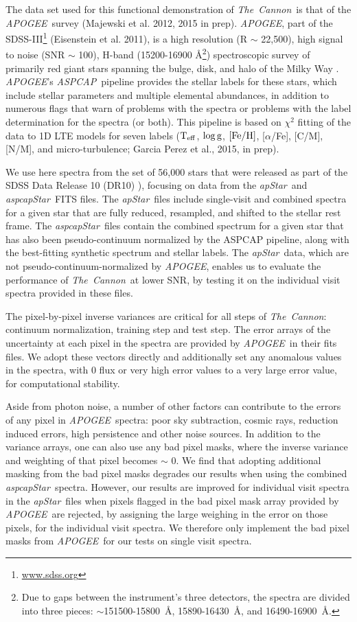 \documentclass[12pt, preprint]{aastex}
\newcommand{\tc}{\textsl{The~Cannon}}
\newcommand{\apogee}{\textsl{APOGEE}}
\newcommand{\aspcap}{\textsl{ASPCAP}}
\newcommand{\aspcapstar}{\textsl{aspcapStar}}
\newcommand{\apstar}{\textsl{apStar}}
\newcommand{\teff}{\mbox{$\rm T_{eff}$}}
\newcommand{\feh}{\mbox{$\rm [Fe/H]$}}
\newcommand{\logg}{\mbox{$\rm \log g$}}
\begin{document}
The data set used for this functional demonstration of \tc\ is that of the \apogee\ survey (Majewski et al. 2012, 2015 in prep). \apogee, part of the SDSS-III\footnote{\url{www.sdss.org}} (Eisenstein et al. 2011), is a high resolution (R $\sim$ 22,500), high signal to noise (SNR $\sim$ 100), H-band (15200-16900 \AA\footnote{Due to gaps between the instrument's three detectors, the spectra are divided into three pieces: $\sim$151500-15800~\AA, 15890-16430~\AA, and 16490-16900~\AA.}) spectroscopic survey of primarily red giant stars spanning the bulge, disk, and halo of the Milky Way \citep{Zaso2013}.  \apogee 's \aspcap\ pipeline provides the stellar labels for these stars, which include stellar parameters and multiple elemental abundances, in addition to numerous flags that warn of problems with the spectra or problems with the label determination for the spectra (or both).  This pipeline is based on $\chi^2$ fitting of the data to 1D LTE models for seven labels (\teff, \logg, \feh, [$\alpha$/Fe], [C/M], [N/M], and micro-turbulence; Garcia Perez et al., 2015, in prep).

We use here spectra from the set of 56,000 stars that were released as part of the SDSS Data Release 10 (DR10) \citep{Ahn2014}), focusing on data from the \apstar\ and  \aspcapstar\ FITS files. The \apstar\ files include single-visit and combined spectra for a given star that are fully reduced, resampled, and shifted to the stellar rest frame.  The \aspcapstar\ files contain the combined spectrum for a given star that has also been pseudo-continuum normalized by the ASPCAP pipeline, along with the best-fitting synthetic spectrum and stellar labels.  The \apstar\ data, which are not pseudo-continuum-normalized by \apogee, enables us to evaluate the performance of \tc\ at lower SNR, by testing it on the individual visit spectra provided in these files. 

The pixel-by-pixel inverse variances are critical for all steps of \tc: continuum normalization, training step and test step. The error arrays of the uncertainty at each pixel in the spectra are provided by \apogee\ in their fits files. We adopt these vectors directly and additionally set any anomalous values in the spectra, with 0 flux or very high error values to a very large error value, for computational stability.  

Aside from photon noise, a number of other factors can contribute to the errors of any pixel in \apogee\ spectra: poor sky subtraction, cosmic rays, reduction induced errors, high persistence and other noise sources. In addition to the variance arrays, one can also use any bad pixel masks, where the
inverse variance and weighting of that pixel becomes $\sim$ 0. We find that adopting additional masking from the bad pixel masks degrades our results when using the combined \aspcapstar\ spectra. However, our results are improved for individual visit spectra in the \apstar\ files when pixels flagged in the bad pixel mask array provided by \apogee\ are rejected, by assigning the large weighing in the error on those pixels, for the individual visit spectra. We therefore only implement the bad pixel masks from \apogee\ for our tests on single visit spectra. 
\end{document}
